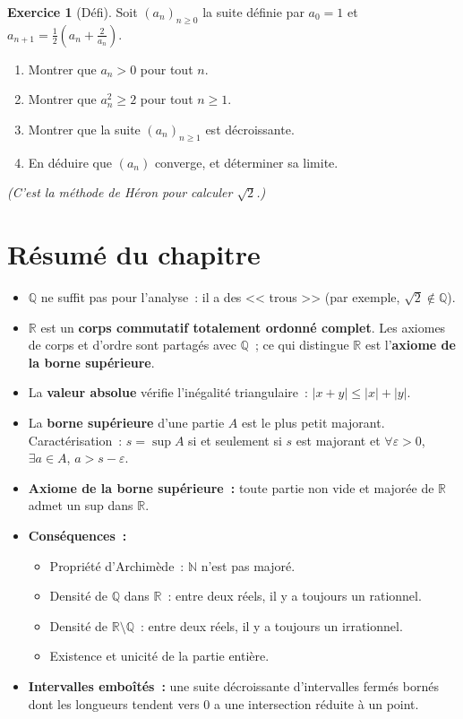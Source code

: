 \documentclass[12pt,a4paper,openany]{book}
\theoremstyle{definition}
\newtheorem{exercice}{Exercice}[chapter]
\newcommand{\N}{\mathbb{N}}
\newcommand{\Q}{\mathbb{Q}}
\newcommand{\R}{\mathbb{R}}
\newcommand{\eps}{\varepsilon}
\newcommand{\abs}[1]{\left\lvert #1 \right\rvert}
\begin{document}
\begin{exercice}[Défi]\label{exo:exo-defi-ch2}
  Soit $(a_n)_{n \geq 0}$ la suite définie par $a_0 = 1$ et $a_{n+1} = \frac{1}{2}\left(a_n + \frac{2}{a_n}\right)$.
  \begin{enumerate}[label=(\alph*)]
    \item Montrer que $a_n > 0$ pour tout $n$.
    \item Montrer que $a_n^2 \geq 2$ pour tout $n \geq 1$.
    \item Montrer que la suite $(a_n)_{n \geq 1}$ est décroissante.
    \item En déduire que $(a_n)$ converge, et déterminer sa limite.
  \end{enumerate}
  \emph{(C'est la méthode de Héron pour calculer $\sqrt{2}$.)}
\end{exercice}


\section*{Résumé du chapitre}

\begin{resumchapitre}
  \begin{itemize}
    \item $\Q$ ne suffit pas pour l'analyse~: il a des << trous >> (par exemple, $\sqrt{2} \notin \Q$).
    \item $\R$ est un \textbf{corps commutatif totalement ordonné complet}. Les axiomes de corps et d'ordre sont partagés avec $\Q$~; ce qui distingue $\R$ est l'\textbf{axiome de la borne supérieure}.
    \item La \textbf{valeur absolue} vérifie l'inégalité triangulaire~: $\abs{x+y} \leq \abs{x} + \abs{y}$.
    \item La \textbf{borne supérieure} d'une partie $A$ est le plus petit majorant. Caractérisation~: $s = \sup A$ si et seulement si $s$ est majorant et $\forall \eps > 0$, $\exists a \in A$, $a > s - \eps$.
    \item \textbf{Axiome de la borne supérieure~:} toute partie non vide et majorée de $\R$ admet un sup dans $\R$.
    \item \textbf{Conséquences~:}
      \begin{itemize}
        \item Propriété d'Archimède~: $\N$ n'est pas majoré.
        \item Densité de $\Q$ dans $\R$~: entre deux réels, il y a toujours un rationnel.
        \item Densité de $\R \setminus \Q$~: entre deux réels, il y a toujours un irrationnel.
        \item Existence et unicité de la partie entière.
      \end{itemize}
    \item \textbf{Intervalles emboîtés~:} une suite décroissante d'intervalles fermés bornés dont les longueurs tendent vers $0$ a une intersection réduite à un point.
  \end{itemize}
\end{resumchapitre}
\end{document}
